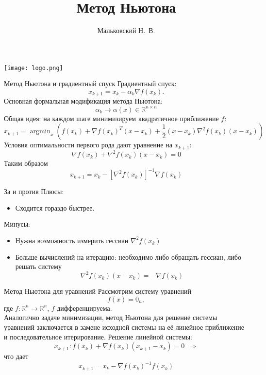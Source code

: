 \documentclass[10pt]{beamer}
\author{Мальковский Н.~В.}
\title[Метод Ньютона]{Метод Ньютона}
\institute[СПбАУ]{Санкт-Петербургский Академический  Университет}
\date{}
\DeclareMathOperator{\argmin}{argmin}
\begin{document}
\begin{frame}
\titlepage
\centering
\texttt{[image: logo.png]}
\end{frame}

\begin{frame}{Метод Ньютона и градиентный спуск}
Градиентный спуск:
$$
x_{k+1}=x_k-\alpha_k\nabla f(x_k).
$$
\pause
Основная формальная модификация метода Ньютона:
$$
\alpha_k\rightarrow \alpha(x)\in \mathbb{R}^{n\times n}
$$
\pause
Общая идея: на каждом шаге минимизируем квадратичное приближение $f$:
$$
x_{k+1}=\argmin_x (f(x_k)+\nabla f(x_k)^T(x-x_k)+\frac{1}{2}(x-x_k)\nabla^2f(x_k)(x-x_k))
$$
\pause
Условия оптимальности первого рода дают уравнение на $x_{k+1}$:
$$
\nabla f(x_k)+\nabla^2f(x_k)(x-x_k)=0
$$
Таким образом
\begin{equation}\label{newton_method}
x_{k+1}=x_k-[\nabla^2 f(x_k)]^{-1}\nabla f(x_k)
\end{equation}
\end{frame}

\begin{frame}{За и против}
Плюсы:
\pause
\begin{itemize}
\item Сходится гораздо быстрее.
\end{itemize}
\pause
Минусы:
\begin{itemize}[<+->]
\item Нужна возможность измерить гессиан $\nabla^2 f(x_k)$
\item Больше вычислений на итерацию: необходимо либо обращать гессиан, либо решать систему
$$
\nabla^2f(x_k)(x-x_k)=-\nabla f(x_k)
$$
\end{itemize}
\end{frame}

\begin{frame}{Метод Ньютона для уравнений}
Рассмотрим систему уравнений
$$
f(x)=0_n,
$$
где $f:\mathbb{R}^n\rightarrow\mathbb{R}^n$, $f$ дифференцируема.\\
\vspace{1em}
\pause
Аналогично задаче минимизации, метод Ньютона для решение системы уравнений заключается в замене исходной системы на её линейное приближение и последовательное итерирование. Решение линейной системы:
$$
x_{k+1}: f(x_k)+\nabla f(x_k)(x_{k+1}-x_k)=0~~\Rightarrow
$$
что дает
\begin{equation}\label{newton_method_root}
x_{k+1}=x_k-\nabla f(x_k)^{-1}f(x_k)
\end{equation}
\end{frame}
\end{document}
